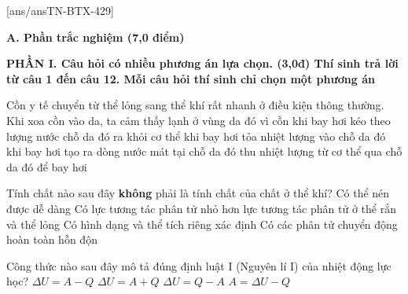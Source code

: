 [ans/ansTN-BTX-429]

\noindent \textbf{A. Phần trắc nghiệm (7,0 điểm)}

\noindent \textbf{PHẦN I. Câu hỏi có nhiều phương án lựa chọn. (3,0đ) Thí sinh trả lời từ câu 1 đến câu 12. Mỗi câu hỏi thí sinh chỉ chọn một phương án}
\vspace{0.2cm}

\begin{ex}	Cồn y tế chuyển từ thể lỏng sang thể khí rất nhanh ở điều kiện thông thường. Khi xoa cồn vào da, ta cảm thấy lạnh ở vùng da đó vì cồn
	\choice
	{khi bay hơi kéo theo lượng nước chỗ da đó ra khỏi cơ thể}
	{khi bay hơi tỏa nhiệt lượng vào chỗ da đó}
	{khi bay hơi tạo ra dòng nước mát tại chỗ da đó}
	{\True thu nhiệt lượng từ cơ thể qua chỗ da đó để bay hơi}
\end{ex}

\begin{ex}	Tính chất nào sau đây \textbf{không} phải là tính chất của chất ở thể khí?
	\choice
	{Có thể nén được dễ dàng}
	{Có lực tương tác phân tử nhỏ hơn lực tương tác phân tử ở thể rắn và thể lỏng}
	{\True Có hình dạng và thể tích riêng xác định}
	{Có các phân tử chuyển động hoàn toàn hỗn độn}
\end{ex}

\begin{ex}	Công thức nào sau đây mô tả đúng định luật I (Nguyên lí I) của nhiệt động lực học?
	\choice
	{$\Delta U=A-Q$}
	{\True $\Delta U=A+Q$}
	{$\Delta U=Q-A$}
	{$A=\Delta U-Q$}
\end{ex}

